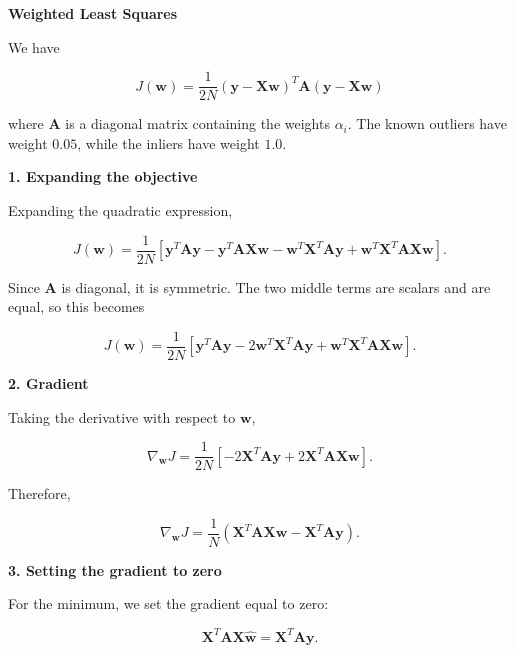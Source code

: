 \documentclass[12pt,a4paper]{article}
\begin{document}
\textbf{Weighted Least Squares}

We have

\begin{equation}
J(\mathbf{w}) = \frac{1}{2N}(\mathbf{y}-\mathbf{Xw})^T \mathbf{A} (\mathbf{y}-\mathbf{Xw})
\label{eq:wlsobj}
\end{equation}

where $\mathbf{A}$ is a diagonal matrix containing the weights $\alpha_i$. The known outliers have
weight $0.05$, while the inliers have weight $1.0$.

\textbf{1. Expanding the objective}

Expanding the quadratic expression,

\begin{equation*}
J(\mathbf{w}) = \frac{1}{2N}\left[
\mathbf{y}^T\mathbf{A}\mathbf{y}
-\mathbf{y}^T\mathbf{A}\mathbf{Xw}
-\mathbf{w}^T\mathbf{X}^T\mathbf{A}\mathbf{y}
+\mathbf{w}^T\mathbf{X}^T\mathbf{A}\mathbf{Xw}
\right].
\end{equation*}

Since $\mathbf{A}$ is diagonal, it is symmetric. The two middle terms are scalars and are equal,
so this becomes

\begin{equation*}
J(\mathbf{w}) = \frac{1}{2N}\left[
\mathbf{y}^T\mathbf{A}\mathbf{y}
-2\mathbf{w}^T\mathbf{X}^T\mathbf{A}\mathbf{y}
+\mathbf{w}^T\mathbf{X}^T\mathbf{A}\mathbf{Xw}
\right].
\end{equation*}

\textbf{2. Gradient}

Taking the derivative with respect to $\mathbf{w}$,

\begin{equation*}
\nabla_{\mathbf{w}}J = \frac{1}{2N}\left[
-2\mathbf{X}^T\mathbf{A}\mathbf{y} + 2\mathbf{X}^T\mathbf{A}\mathbf{Xw}\right].
\end{equation*}

Therefore,

\begin{equation}
\nabla_{\mathbf{w}}J = \frac{1}{N}\left(
\mathbf{X}^T\mathbf{A}\mathbf{Xw} - \mathbf{X}^T\mathbf{A}\mathbf{y}\right).
\label{eq:wlsgrad}
\end{equation}

\textbf{3. Setting the gradient to zero}

For the minimum, we set the gradient equal to zero:

\begin{equation}
\mathbf{X}^T\mathbf{A}\mathbf{X}\hat{\mathbf{w}} = \mathbf{X}^T\mathbf{A}\mathbf{y}.
\label{eq:wlsnormal}
\end{equation}
\end{document}
